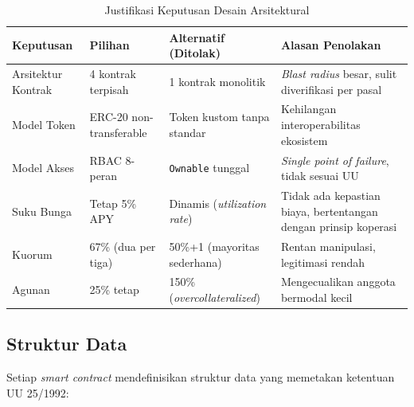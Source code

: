 \begin{table}[H]
\centering
\caption{Justifikasi Keputusan Desain Arsitektural}
\label{tab:design-decisions}
\small
\begin{tabular}{p{}p{}p{}p{}}
\toprule
\textbf{Keputusan} & \textbf{Pilihan} & \textbf{Alternatif (Ditolak)} & \textbf{Alasan Penolakan} \\
\midrule
Arsitektur Kontrak & 4 kontrak terpisah & 1 kontrak monolitik & \textit{Blast radius} besar, sulit diverifikasi per pasal \\
Model Token & ERC-20 non-transferable & Token kustom tanpa standar & Kehilangan interoperabilitas ekosistem \\
Model Akses & RBAC 8-peran & \texttt{Ownable} tunggal & \textit{Single point of failure}, tidak sesuai UU \\
Suku Bunga & Tetap 5\% APY & Dinamis (\textit{utilization rate}) & Tidak ada kepastian biaya, bertentangan dengan prinsip koperasi \\
Kuorum & 67\% (dua per tiga) & 50\%+1 (mayoritas sederhana) & Rentan manipulasi, legitimasi rendah \\
Agunan & 25\% tetap & 150\% (\textit{overcollateralized}) & Mengecualikan anggota bermodal kecil \\
\bottomrule
\end{tabular}
\end{table}

\subsection{Struktur Data}

Setiap \textit{smart contract} mendefinisikan struktur data yang memetakan ketentuan UU 25/1992:

